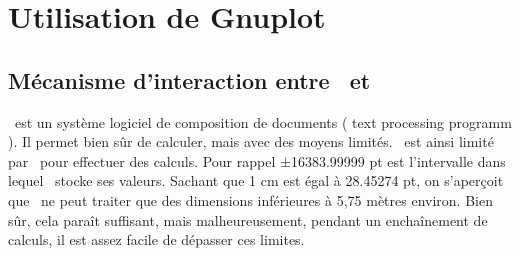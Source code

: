 \section{Utilisation de Gnuplot}
\subsection{Mécanisme d'interaction entre \TIKZ\ et }

\TEX\  est un système logiciel de composition de documents ( text processing programm ). Il permet bien sûr de calculer, mais avec des moyens limités. \TIKZ\ est ainsi limité par \TEX\ pour effectuer des calculs. Pour rappel ±16383.99999 pt est l'intervalle dans lequel \TEX\ stocke ses valeurs. Sachant que 1 cm est égal à 28.45274 pt, on s'aperçoit que \TEX\ ne  peut traiter que des dimensions inférieures à 5,75 mètres environ.
Bien sûr, cela paraît suffisant, mais malheureusement, pendant un enchaînement de calculs, il est assez facile de dépasser ces limites.

\bigskip
 \tkzActivOff
  \newcommand{\drawpage}[4]{%
  \begin{scope}[xshift=#1, yshift=#2,font=\footnotesize]
    \filldraw[fill=white!75!#4,draw=#4, very thin]%
   (0,0) -- (4.2,0) -- (4.2,4.85) --(3.21,5.84)-- (0,5.84) -- cycle;
   \fill[fill=#4,shade,top color=#4,bottom color=#4!40]%
       (3.21,5.84) -- ++(0,-0.99) -- ++(0.99,0) -- cycle;
    \path (2.1,2.97) node{#3};
  \end{scope}
}


